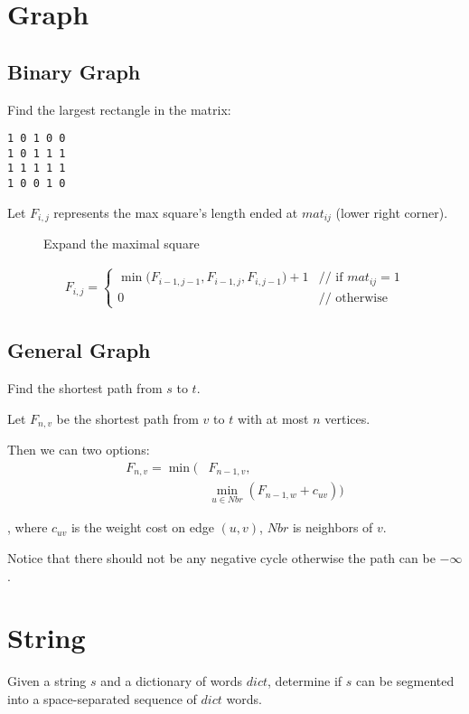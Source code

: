 {\section{Graph}
\subsection{Binary Graph}
 Find the largest rectangle in the matrix:
\begin{lstlisting}
1 0 1 0 0
1 0 1 1 1
1 1 1 1 1
1 0 0 1 0
\end{lstlisting}
Let $F_{i, j}$ represents the max square's length ended at $mat_{ij}$ (lower right
corner).

\begin{figure}[!htp]
\centering
{}
\caption{Expand the maximal square}
\label{fig:squareMatrix}
\end{figure}
\begin{eqnarray*}
F_{i, j} = \left\{ \begin{array}{rl}
  \min\big(F_{i-1, j-1}, F_{i-1, j}, F_{i, j-1}\big)+1 &\mbox{// if $mat_{i j}=1$}
\\
  0 &\mbox{// otherwise}
       \end{array} \right.
\end{eqnarray*}
\subsection{General Graph}
 Find the shortest path from $s$ to $t$. 

Let $F_{n, v}$ be the shortest path from $v$ to $t$ with at most $n$ vertices. 

Then we can two options:
\begin{align*}
F_{n, v} = \min\Big(& F_{n-1, v}, \\
& \min_{u \in Nbr}(F_{n-1, w}+c_{uv})\Big)
\end{align*}

, where $c_{uv}$ is the weight cost on edge $(u, v)$, $Nbr$ is neighbors of $v$.
 
Notice that there should not be any negative cycle otherwise the path can be $-\infty$. 
\section{String}
 Given a string $s$ and a dictionary of words $dict$, determine if $s$ can be segmented into a space-separated sequence of $dict$ words.

}
